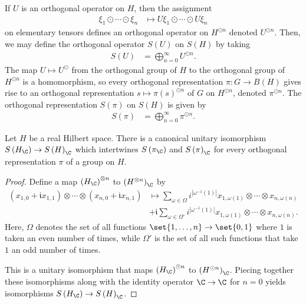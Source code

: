 \documentclass[10pt]{mypackage}
\begin{document}
If $U$ is an orthogonal operator on $H$, then the assignment
\begin{align*}
  \xi_1\odot\cdots\odot \xi_n &\mapsto U\xi_1\odot\cdots\odot U\xi_n
\end{align*}
on elementary tensors defines an orthogonal operator on $H^{\odot n}$ denoted $U^{\odot n}$. Then, we may define the orthogonal operator $S(U)$ on $S(H)$ by taking
\begin{align*}
  S(U) &= \bigoplus_{n=0}^{\infty}U^{\odot n}.
\end{align*}
The map $U\mapsto U^{\odot}$ from the orthogonal group of $H$ to the orthogonal group of $H^{\odot n}$ is a homomorphism, so every orthogonal representation $\pi\colon G\rightarrow B\left( H \right)$ gives rise to an orthogonal representation $s\mapsto \pi(s)^{\odot n}$ of $G$ on $H^{\odot n}$, denoted $\pi^{\odot n}$. The orthogonal representation $S(\pi)$ on $S(H)$ is given by
\begin{align*}
  S(\pi) &= \bigoplus_{n=0}^{\infty} \pi^{\odot n}.
\end{align*}
\begin{proposition}
  Let $H$ be a real Hilbert space. There is a canonical unitary isomorphism $S\left( H_{\C} \right)\rightarrow S\left( H \right)_{\C}$ which intertwines $S\left( \pi_{\C} \right)$ and $S\left( \pi \right)_{\C}$ for every orthogonal representation $\pi$ of a group on $H$.
\end{proposition}
\begin{proof}
  Define a map $\left( H_{\C} \right)^{\otimes n}$ to $\left( H^{\otimes n} \right)_{\C}$ by
  \begin{align*}
    \left( x_{1,0} + \mathfrak{i}x_{1,1} \right)\otimes\cdots\otimes \left( x_{n,0} + \mathfrak{i}x_{n,1} \right) &\mapsto \sum_{\omega\in \Omega} i^{\left\vert \omega^{-1}(1) \right\vert} x_{1,\omega(1)}\otimes\cdots\otimes x_{n,\omega(n)}\\
                                                                                                                        &+ \mathfrak{i}\sum_{\omega\in \Omega'} i^{\left\vert \omega^{-1}(1) \right\vert} x_{1,\omega(1)}\otimes\cdots\otimes x_{n,\omega(n)}.
  \end{align*}
  Here, $\Omega$ denotes the set of all functions $\set{1,\dots,n}\rightarrow \set{0,1}$ where $1$ is taken an even number of times, while $\Omega'$ is the set of all such functions that take $1$ an odd number of times.

  This is a unitary isomorphism that maps $\left( H_{\C} \right)^{\odot n}$ to $\left( H^{\odot n} \right)_{\C}$. Piecing together these isomorphisms along with the identity operator $\C\rightarrow \C$ for $n = 0$ yields isomorphisms $S\left( H_{\C} \right)\rightarrow S\left( H \right)_{\C}$.
\end{proof}
\end{document}
